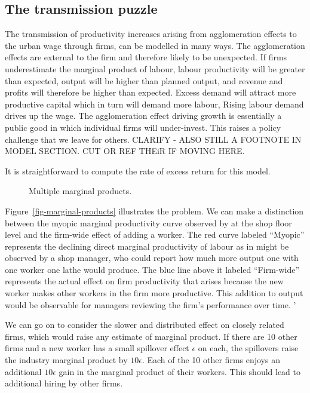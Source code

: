 \subsection{The transmission puzzle}

The transmission of productivity increases arising from agglomeration effects  to the urban wage through firms, can be modelled in many ways. The agglomeration effects are external to the firm and therefore likely to be unexpected. If  firms underestimate the marginal product of labour, labour productivity will be greater than expected, output will be higher than planned output, and revenue and profits will therefore be higher than expected. Excess demand will attract more productive capital which in turn will demand more labour,  Rising labour demand drives up the wage. The agglomeration effect driving growth is essentially a public good in which individual firms will under-invest. This raises a policy challenge that we leave for others. CLARIFY - ALSO STILL A FOOTNOTE IN MODEL SECTION. CUT OR REF THEiR IF MOVING HERE.

 It is straightforward to compute the rate of excess return for  this model. 


\begin{figure}
\centering

\caption{Multiple marginal products.}
\label{fig-multiple-marginal-products}
\end{figure}



Figure~\ref{fig-marginal-products} illustrates the problem. We can  make a distinction between the myopic marginal productivity curve observed by at the shop floor level and  the firm-wide effect of adding a worker. The red curve labeled ``Myopic'' represents the declining direct marginal productivity of labour as in might be observed by a shop manager, who could report how much more output one with one worker one lathe would produce. The blue line above it labeled ``Firm-wide'' represents the actual effect on firm productivity that arises because the new worker makes other workers in the firm more productive. This addition to output would be observable for managers reviewing the firm's performance over time. ' 

We can go on to consider the slower and distributed effect on closely related firms, which would raise any estimate of marginal product.  If there are 10 other firms and a new worker  has a small spillover effect  $\epsilon$ on each,  the spillovers raise the industry  marginal product  by $10\epsilon$. Each of the  10 other firms  enjoys  an additional $10\epsilon$ gain in the marginal product of their workers. This should lead to additional hiring by other firms.

